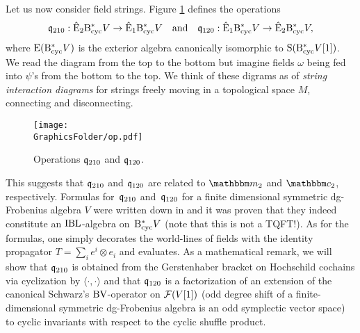 \documentclass[\MainFolder/Text.tex]{subfiles}
\begin{document}
Let us now consider field strings. Figure \ref{Fig:OpCoOpDiag} defines the operations $$ \mathfrak{q}_{210}: \hat{\mathrm{E}}_2 \mathrm{B}_{\mathrm{cyc}}^* V \rightarrow \hat{\mathrm{E}}_1\mathrm{B}_{\mathrm{cyc}}^* V \quad\text{and}\quad \mathfrak{q}_{120}: \hat{\mathrm{E}}_1\mathrm{B}_{\mathrm{cyc}}^* V \rightarrow \hat{\mathrm{E}}_2\mathrm{B}_{\mathrm{cyc}}^* V, $$
where $\mathrm{E}(\mathrm{B}_{\mathrm{cyc}}^* V)$ is the exterior algebra canonically isomorphic to $\mathrm{S}(\mathrm{B}_{\mathrm{cyc}}^* V [1])$. We read the diagram from the top to the bottom but imagine fields $\omega$ being fed into $\psi$'s from the bottom to the top. We think of these digrams as of \emph{string interaction diagrams} for strings freely moving in a topological space $M$, connecting and disconnecting.
\begin{figure}[t]\label{Fig:OpCoOpDiag}
\centering
 \texttt{[image: \\GraphicsFolder/op.pdf]}
 \caption{Operations $\mathfrak{q}_{210}$ and $\mathfrak{q}_{120}$.}
\end{figure}
%
This suggests that $\mathfrak{q}_{210}$ and $\mathfrak{q}_{120}$ are related to $\StringOp_2$ and $\StringCoOp_2$, respectively. Formulas for~$\mathfrak{q}_{210}$ and~$\mathfrak{q}_{120}$ for a finite dimensional symmetric dg-Frobenius algebra $V$ were written down in \cite{Cieliebak2015} and it was proven that they indeed constitute an $\mathrm{IBL}$-algebra on~$\mathrm{B}_{\mathrm{cyc}}^* V$ (note that this is not a TQFT!). As for the formulas, one simply decorates the world-lines of fields with the identity propagator $T = \sum_i e^i \otimes e_i$ and evaluates. As a mathematical remark, we will show that $\mathfrak{q}_{210}$ is obtained from the Gerstenhaber bracket on Hochschild cochains via cyclization by $\langle\cdot,\cdot\rangle$ and that $\mathfrak{q}_{120}$  is a factorization of an extension of the canonical Schwarz's $\mathrm{BV}$-operator on $\mathcal{F}(V[1])$ (odd degree shift of a finite-dimensional symmetric dg-Frobenius algebra is an odd symplectic vector space) to cyclic invariants with respect to the cyclic shuffle product.
\end{document}
